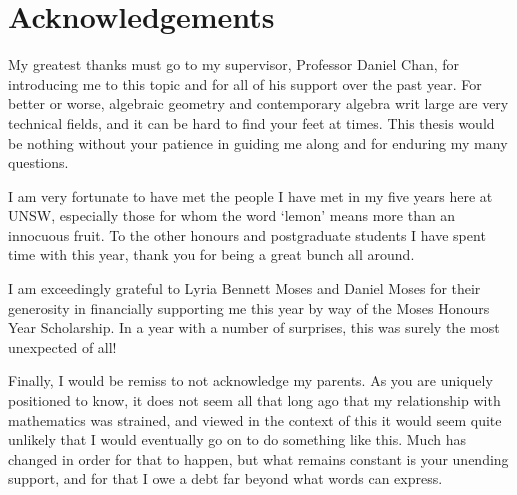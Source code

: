\chapter*{Acknowledgements}

My greatest thanks must go to my supervisor, Professor Daniel Chan,
for introducing me to this topic and for all of his support over the past year.
For better or worse, algebraic geometry and contemporary algebra writ
large are very technical fields, and it can be hard to find your feet at times.
This thesis would be nothing without your patience in guiding me
along and for enduring my many questions.

I am very fortunate to have met the people I have met in my five
years here at UNSW, especially those for whom the word `lemon' means
more than an innocuous fruit.
To the other honours and postgraduate students I have spent time with
this year, thank you for being a great bunch all around.

I am exceedingly grateful to Lyria Bennett Moses and Daniel Moses for
their generosity in financially supporting me this year by way of the
Moses Honours Year Scholarship.
In a year with a number of surprises, this was surely the most
unexpected of all!

Finally, I would be remiss to not acknowledge my parents.
As you are uniquely positioned to know, it does not seem all that
long ago that my relationship with mathematics was strained, and
viewed in the context of this it would seem quite unlikely that I
would eventually go on to do something like this.
Much has changed in order for that to happen, but what remains
constant is your unending support, and for that I owe a debt far
beyond what words can express.
